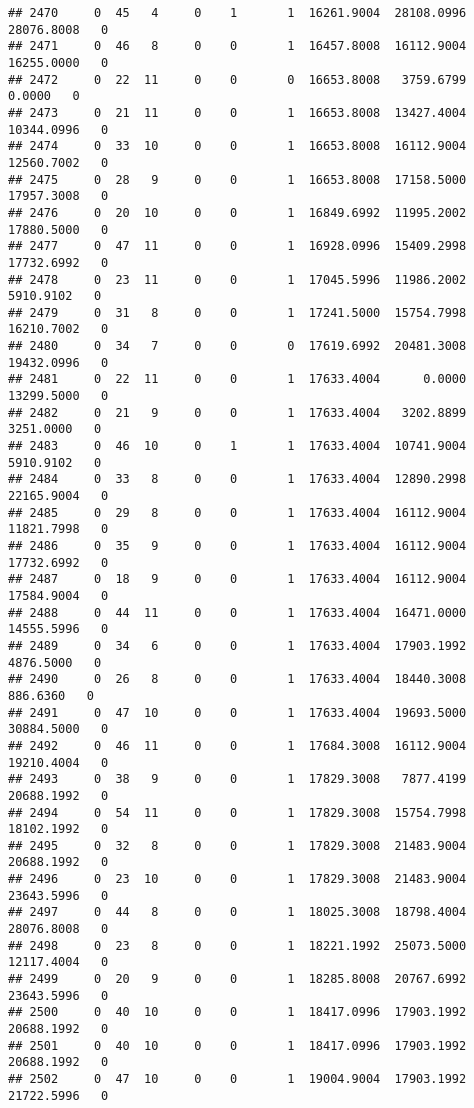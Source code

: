 \documentclass[
]{article}
\begin{document}
\begin{enumerate}
\begin{verbatim}
## 2470     0  45   4     0    1       1  16261.9004  28108.0996  28076.8008   0
## 2471     0  46   8     0    0       1  16457.8008  16112.9004  16255.0000   0
## 2472     0  22  11     0    0       0  16653.8008   3759.6799      0.0000   0
## 2473     0  21  11     0    0       1  16653.8008  13427.4004  10344.0996   0
## 2474     0  33  10     0    0       1  16653.8008  16112.9004  12560.7002   0
## 2475     0  28   9     0    0       1  16653.8008  17158.5000  17957.3008   0
## 2476     0  20  10     0    0       1  16849.6992  11995.2002  17880.5000   0
## 2477     0  47  11     0    0       1  16928.0996  15409.2998  17732.6992   0
## 2478     0  23  11     0    0       1  17045.5996  11986.2002   5910.9102   0
## 2479     0  31   8     0    0       1  17241.5000  15754.7998  16210.7002   0
## 2480     0  34   7     0    0       0  17619.6992  20481.3008  19432.0996   0
## 2481     0  22  11     0    0       1  17633.4004      0.0000  13299.5000   0
## 2482     0  21   9     0    0       1  17633.4004   3202.8899   3251.0000   0
## 2483     0  46  10     0    1       1  17633.4004  10741.9004   5910.9102   0
## 2484     0  33   8     0    0       1  17633.4004  12890.2998  22165.9004   0
## 2485     0  29   8     0    0       1  17633.4004  16112.9004  11821.7998   0
## 2486     0  35   9     0    0       1  17633.4004  16112.9004  17732.6992   0
## 2487     0  18   9     0    0       1  17633.4004  16112.9004  17584.9004   0
## 2488     0  44  11     0    0       1  17633.4004  16471.0000  14555.5996   0
## 2489     0  34   6     0    0       1  17633.4004  17903.1992   4876.5000   0
## 2490     0  26   8     0    0       1  17633.4004  18440.3008    886.6360   0
## 2491     0  47  10     0    0       1  17633.4004  19693.5000  30884.5000   0
## 2492     0  46  11     0    0       1  17684.3008  16112.9004  19210.4004   0
## 2493     0  38   9     0    0       1  17829.3008   7877.4199  20688.1992   0
## 2494     0  54  11     0    0       1  17829.3008  15754.7998  18102.1992   0
## 2495     0  32   8     0    0       1  17829.3008  21483.9004  20688.1992   0
## 2496     0  23  10     0    0       1  17829.3008  21483.9004  23643.5996   0
## 2497     0  44   8     0    0       1  18025.3008  18798.4004  28076.8008   0
## 2498     0  23   8     0    0       1  18221.1992  25073.5000  12117.4004   0
## 2499     0  20   9     0    0       1  18285.8008  20767.6992  23643.5996   0
## 2500     0  40  10     0    0       1  18417.0996  17903.1992  20688.1992   0
## 2501     0  40  10     0    0       1  18417.0996  17903.1992  20688.1992   0
## 2502     0  47  10     0    0       1  19004.9004  17903.1992  21722.5996   0

\end{verbatim}
\end{enumerate}
\end{document}
